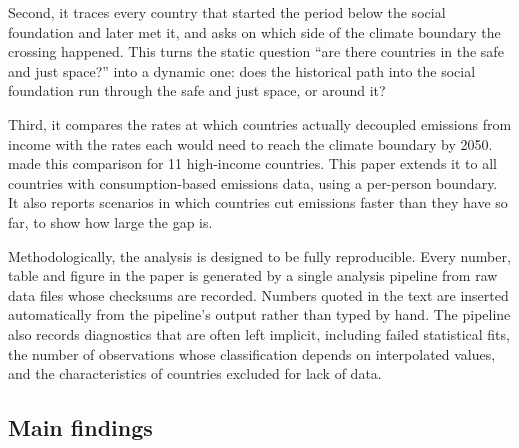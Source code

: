 Second, it traces every country that started the period below the social foundation and later met it, and asks on which side of the climate boundary the crossing happened. This turns the static question ``are there countries in the safe and just space?'' into a dynamic one: does the historical path into the social foundation run through the safe and just space, or around it?

Third, it compares the rates at which countries actually decoupled emissions from income with the rates each would need to reach the climate boundary by 2050. \citet{vogel2023} made this comparison for 11 high-income countries. This paper extends it to all \nNCons{} countries with consumption-based emissions data, using a per-person boundary. It also reports scenarios in which countries cut emissions faster than they have so far, to show how large the gap is.

Methodologically, the analysis is designed to be fully reproducible. Every number, table and figure in the paper is generated by a single analysis pipeline from raw data files whose checksums are recorded. Numbers quoted in the text are inserted automatically from the pipeline's output rather than typed by hand. The pipeline also records diagnostics that are often left implicit, including failed statistical fits, the number of observations whose classification depends on interpolated values, and the characteristics of countries excluded for lack of data.

\subsection*{Main findings}


